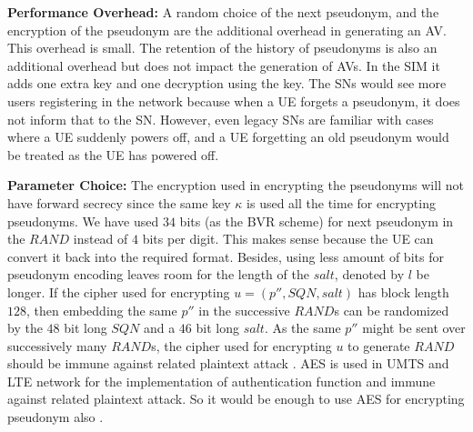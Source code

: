 \documentclass{llncs} %
\begin{document}

\textbf{Performance Overhead:} A random choice of the next pseudonym, and the encryption of the pseudonym are the additional overhead in generating an AV. This overhead is small. The retention of the history of pseudonyms is also an additional overhead but does not impact the generation of AVs. In the SIM it adds one extra key and one decryption using the key. The SNs would see more users registering in the network because when a UE forgets a pseudonym, it does not inform that to the SN. However, even legacy SNs are familiar with cases where a UE suddenly powers off, and a UE forgetting an old pseudonym would be treated as the UE has powered off.

\textbf{Parameter Choice:} The encryption used in encrypting the pseudonyms will not have forward secrecy since the same key $\kappa$ is used all the time for encrypting pseudonyms. We have used $34$ bits (as the BVR scheme) for next pseudonym in the $RAND$ instead of $4$ bits per digit. This makes sense because the UE can convert it back into the required format. Besides, using less amount of bits for pseudonym encoding leaves room for the length of the $salt$, denoted by $l$ be longer. If the cipher used for encrypting $u=\left(p'',SQN,salt\right)$ has block length $128$, then embedding the same $p''$ in the successive $RAND$s can be randomized by the $48$ bit long $SQN$ and a $46$ bit long $salt$. As the same $p''$ might be sent over successively many $RAND$s, the cipher used for encrypting $u$ to generate $RAND$ should be immune against related plaintext attack \cite{CCS15}. AES is used in UMTS and LTE network for the implementation of authentication function and immune against related plaintext attack. So it would be enough to use AES for encrypting pseudonym also \cite{CCS15}. 
\end{document}
